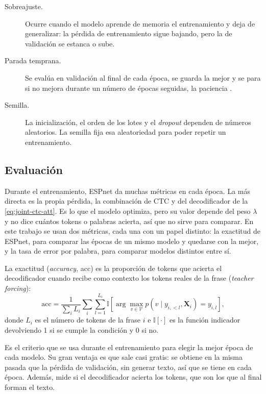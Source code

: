 \begin{description}
  \item[Sobreajuste.] Ocurre cuando el modelo aprende de memoria el entrenamiento y deja de generalizar: la pérdida de entrenamiento sigue bajando, pero la de validación se estanca o sube.

  \item[Parada temprana.] Se evalúa en validación al final de cada época, se guarda la mejor y se para si no mejora durante un número de épocas seguidas, la paciencia \cite{prechelt1998early}.

  \item[Semilla.] La inicialización, el orden de los lotes y el \textit{dropout} dependen de números aleatorios. La semilla fija esa aleatoriedad para poder repetir un entrenamiento.
\end{description}

\subsection{Evaluación}
\label{sec:metricas-teoria}

Durante el entrenamiento, ESPnet da muchas métricas en cada época. La más directa es la propia pérdida, la combinación de CTC y del decodificador de la \cref{eq:joint-ctc-att}. Es lo que el modelo optimiza, pero su valor depende del peso $\lambda$ y no dice cuántos tokens o palabras acierta, así que no sirve para comparar. En este trabajo se usan dos métricas, cada una con un papel distinto: la exactitud de ESPnet, para comparar las épocas de un mismo modelo y quedarse con la mejor, y la tasa de error por palabra, para comparar modelos distintos entre sí.

La exactitud (\textit{accuracy}, acc) es la proporción de tokens que acierta el decodificador cuando recibe como contexto los tokens reales de la frase (\textit{teacher forcing}):
\begin{equation}
  \mathrm{acc} = \frac{1}{\sum_i L_i} \sum_{i} \sum_{l=1}^{L_i} \mathbb{I}\!\left[ \arg\max_{v \in \mathcal{V}} p(v \mid y_{i,<l}, \mathbf{X}_i) = y_{i,l} \right],
  \label{eq:acc}
\end{equation}
donde $L_i$ es el número de tokens de la frase $i$ e $\mathbb{I}[\cdot]$ es la función indicador devolviendo 1 si se cumple la condición y 0 si no.

Es el criterio que se usa durante el entrenamiento para elegir la mejor época de cada modelo. Su gran ventaja es que sale casi gratis: se obtiene en la misma pasada que la pérdida de validación, sin generar texto, así que se tiene en cada época. Además, mide si el decodificador acierta los tokens, que son los que al final forman el texto.

